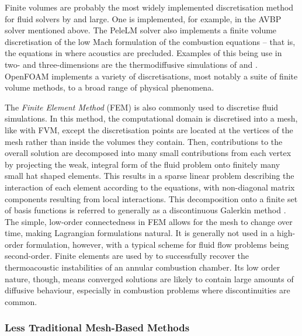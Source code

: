 Finite volumes are probably the most widely implemented discretisation method for fluid solvers by and large. One is implemented, for example, in the AVBP solver mentioned above. The PeleLM solver \cite{amrex-combustionPeleLM} also implements a finite volume discretisation of the low Mach formulation of the combustion equations -- that is, the equations in  where acoustics are precluded. Examples of this being use in two- and three-dimensions are the thermodiffusive simulations of \cite{howarth2022EmpiricalCharacteristicScaling} and \cite{howarth2023ThermodiffusivelyUnstableLeanPremixed}. OpenFOAM \cite{opencfdltd2004OpenFOAM} implements a variety of discretisations, most notably a suite of finite volume methods, to a broad range of physical phenomena.


The \emph{Finite Element Method} (FEM) is also commonly used to discretise fluid simulations. In this method, the computational domain is discretised into a mesh, like with FVM, except the discretisation points are located at the vertices of the mesh rather than inside the volumes they contain. Then, contributions to the overall solution are decomposed into many small contributions from each vertex by projecting the weak, integral form of the fluid problem onto finitely many small hat shaped elements. This results in a sparse linear problem describing the interaction of each element according to the equations, with non-diagonal matrix components resulting from local interactions. This decomposition onto a finite set of basis functions is referred to generally as a discontinuous Galerkin method \cite{zienkiewicz20051StandardDiscrete}. The simple, low-order connectedness in FEM allows for the mesh to change over time, making Lagrangian formulations natural. It is generally not used in a high-order formulation, however, with a typical scheme for fluid flow problems being second-order. Finite elements are used by \cite{camporeale2010FiniteElementMethod} to successfully recover the thermoacoustic instabilities of an annular combustion chamber. Its low order nature, though, means converged solutions are likely to contain large amounts of diffusive behaviour, especially in combustion problems where discontinuities are common.



\subsubsection{Less Traditional Mesh-Based Methods}

